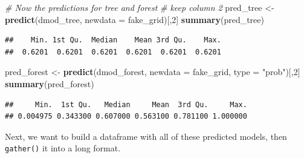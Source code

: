 \documentclass[]{article}
\newenvironment{Shaded}{\begin{snugshade}}{\end{snugshade}}
\newcommand{\KeywordTok}[1]{\textcolor[rgb]{0.13,0.29,0.53}{\textbf{{#1}}}}
\newcommand{\DataTypeTok}[1]{\textcolor[rgb]{0.13,0.29,0.53}{{#1}}}
\newcommand{\DecValTok}[1]{\textcolor[rgb]{0.00,0.00,0.81}{{#1}}}
\newcommand{\StringTok}[1]{\textcolor[rgb]{0.31,0.60,0.02}{{#1}}}
\newcommand{\CommentTok}[1]{\textcolor[rgb]{0.56,0.35,0.01}{\textit{{#1}}}}
\newcommand{\NormalTok}[1]{{#1}}
\begin{document}
\begin{Shaded}
\begin{Highlighting}[]
\CommentTok{# Now the predictions for tree and forest}
\CommentTok{# keep column 2}
\NormalTok{pred_tree <-}\StringTok{ }\KeywordTok{predict}\NormalTok{(dmod_tree, }\DataTypeTok{newdata =} \NormalTok{fake_grid)[,}\DecValTok{2}\NormalTok{]}
\KeywordTok{summary}\NormalTok{(pred_tree)}
\end{Highlighting}
\end{Shaded}

\begin{verbatim}
##    Min. 1st Qu.  Median    Mean 3rd Qu.    Max. 
##  0.6201  0.6201  0.6201  0.6201  0.6201  0.6201
\end{verbatim}

\begin{Shaded}
\begin{Highlighting}[]
\NormalTok{pred_forest <-}\StringTok{ }\KeywordTok{predict}\NormalTok{(dmod_forest, }\DataTypeTok{newdata =} \NormalTok{fake_grid, }\DataTypeTok{type =} \StringTok{"prob"}\NormalTok{)[,}\DecValTok{2}\NormalTok{]}
\KeywordTok{summary}\NormalTok{(pred_forest)}
\end{Highlighting}
\end{Shaded}

\begin{verbatim}
##     Min.  1st Qu.   Median     Mean  3rd Qu.     Max. 
## 0.004975 0.343300 0.607000 0.563100 0.781100 1.000000
\end{verbatim}

\begin{Shaded}
\end{Shaded}

Next, we want to build a dataframe with all of these predicted models,
then \texttt{gather()} it into a long format.
\end{document}
